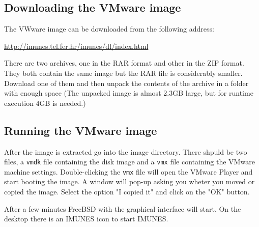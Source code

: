 \subsection{Downloading the VMware image}
The VWware image can be downloaded
from the following address:
\begin{center}
\url{http://imunes.tel.fer.hr/imunes/dl/index.html}
\end{center}
There are two archives, one in the RAR format and other in the ZIP format. They
both contain the same image but the RAR file is considerably smaller. Download
one of them and then unpack the contents of the archive in a folder with enough
space (The unpacked image is almost 2.3GB large, but for runtime execution 4GB
is needed.)

\subsection{Running the VMware image}
After the image is extracted go into the image directory. There shpuld be two
files, a \texttt{vmdk} file containing the disk image and a \texttt{vmx} file
containing the VMware machine settings. Double-clicking the \texttt{vmx} file
will open the VMware Player and start booting the image. A window will pop-up
asking you wheter you moved or copied the image. Select the option "I copied it"
and click on the "OK" button.

After a few minutes FreeBSD with the graphical interface will start. On the
desktop there is an IMUNES icon to start IMUNES.

%
%
%
%
%
%

